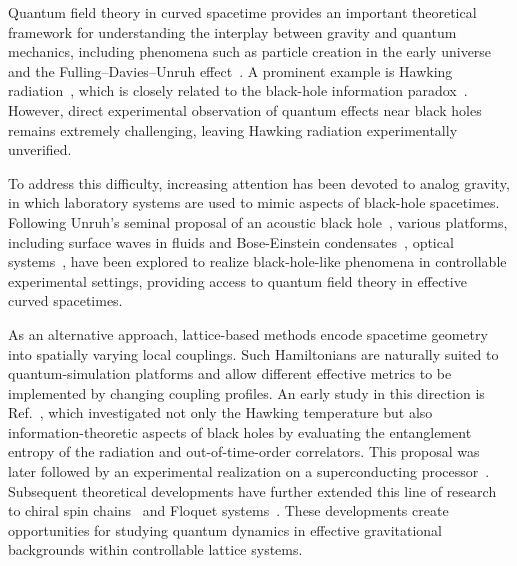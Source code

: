 \documentclass[reprint,amsmath,amssymb,aps,prb,showkeys]{revtex4-2}
\begin{document}
Quantum field theory in curved spacetime provides an important theoretical framework for understanding the interplay between gravity and quantum mechanics, including phenomena such as particle creation in the early universe and the Fulling--Davies--Unruh effect~\cite{PhysRevLett.21.562,1973PhRvD...7.2850F,1975JPhA....8..609D,1976PhRvD..14..870U}. A prominent example is Hawking radiation~\cite{1974Natur.248...30H,Hawking:1975vcx}, which is closely related to the black-hole information paradox~\cite{PhysRevD.14.2460}. However, direct experimental observation of quantum effects near black holes remains extremely challenging, leaving Hawking radiation experimentally unverified.

To address this difficulty, increasing attention has been devoted to analog gravity, in which laboratory systems are used to mimic aspects of black-hole spacetimes. Following Unruh's seminal proposal of an acoustic black hole~\cite{1981PhRvL..46.1351U}, various platforms, including surface waves in fluids\cite{PhysRevD.66.044019,e06e01934881436f856d1022f41522b9,PhysRevLett.106.021302} and Bose-Einstein condensates~\cite{PhysRevLett.85.4643,Steinhauer:2015saa}, optical systems~\cite{Sheng2013Trapping,Bekenstein2017Control,Sheng2018Definite}, have been explored to realize black-hole-like phenomena in controllable experimental settings, providing access to quantum field theory in effective curved spacetimes.

As an alternative approach, lattice-based methods encode spacetime geometry into spatially varying local couplings. Such Hamiltonians are naturally suited to quantum-simulation platforms and allow different effective metrics to be implemented by changing coupling profiles. An early study in this direction is Ref.~\cite{PhysRevResearch.2.023107}, which investigated not only the Hawking temperature but also information-theoretic aspects of black holes by evaluating the entanglement entropy of the radiation and out-of-time-order correlators. This proposal was later followed by an experimental realization on a superconducting processor~\cite{Shi2023Quantum,rhyno2026observingquantummanybodydynamics}. Subsequent theoretical developments have further extended this line of research to chiral spin chains~\cite{PhysRevLett.130.016701,Daniel2025Optimally,daniel2026quantumteleportationsimulatedbinary,sofos2026entanglementapparentthermalitysimulated} and Floquet systems~\cite{benhemou2025probingquantumpropertiesblack}. These developments create opportunities for studying quantum dynamics in effective gravitational backgrounds within controllable lattice systems.
\end{document}

